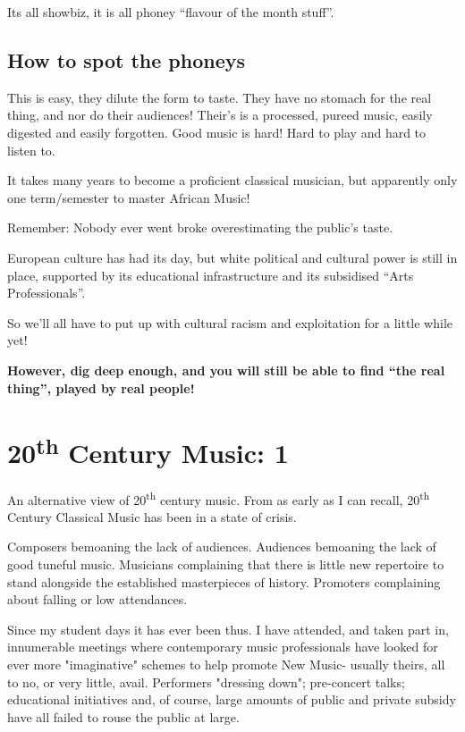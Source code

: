 \documentclass{article}
\begin{document}
Its all showbiz, it is all phoney ``flavour of the month stuff''.\footnotemark


\subsection{How to spot the phoneys}

This is easy, they dilute the form to taste.
They have no stomach for the real thing, and nor do their audiences!
Their's is a processed, pureed music, easily digested and easily forgotten.
Good music is hard!
Hard to play and hard to listen to.

It takes many years to become a proficient classical musician, but apparently only one term/semester to master African Music!

Remember: Nobody ever went broke overestimating the public's taste.

European culture has had its day, but white political and cultural power is still in place, supported by its educational infrastructure and its subsidised ``Arts Professionals''.

So we'll all have to put up with cultural racism and exploitation for a little while yet!

\textbf{However, dig deep enough, and you will still be able to find ``the real thing'', played by real people!}

\pagebreak
\section{20\textsuperscript{th} Century Music: 1}

An alternative view of 20\textsuperscript{th} century music.
From as early as I can recall, 20\textsuperscript{th} Century Classical Music has been in a state of crisis.

Composers bemoaning the lack of audiences.
Audiences bemoaning the lack of good tuneful music.
Musicians complaining that there is little new repertoire to stand alongside the established masterpieces of history.
Promoters complaining about falling or low attendances.

Since my student days it has ever been thus.
I have attended, and taken part in, innumerable meetings where contemporary music professionals have looked for ever more "imaginative" schemes to help promote New Music- usually theirs, all to no, or very little, avail.
Performers "dressing down"; pre-concert talks; educational initiatives and, of course, large amounts of public and private subsidy have all failed to rouse the public at large.
\end{document}
